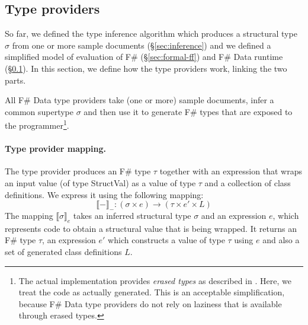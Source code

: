 \documentclass[10pt,preprint,blind,clearpagebib]{sigplanconf}
\newcommand{\ident}[1]{\textnormal{\sffamily #1}}
\newcommand{\sem}[1]{\llbracket #1 \rrbracket}
\begin{document}

\subsection{Type providers}
\label{sec:formal-tp}

So far, we defined the type inference algorithm which produces a structural type $\sigma$ from one 
or more sample documents (\S\ref{sec:inference}) and we defined a simplified model of evaluation
of F\# (\S\ref{sec:formal-ff}) and F\# Data runtime (\S\ref{sec:formal-tp}). In this section, we 
define how the type providers work, linking the two parts.

All F\# Data type providers take (one or more) sample documents, infer a common supertype $\sigma$
and then use it to generate F\# types that are exposed to the programmer\footnote{The actual 
implementation provides \emph{erased types} as described in \cite{fsharp-typeprov}. Here, we treat 
the code as actually generated. This is an acceptable simplification, because F\# Data type providers 
do not rely on laziness that is available through erased types.}. 

\paragraph{Type provider mapping.}
The type provider produces an F\# type $\tau$ together with an expression that wraps an input
value (of type \ident{StructVal}) as a value of type $\tau$ and a collection of class definitions. 
We express it using the following mapping:
%
\begin{equation*}
\sem{-}_{-} : (\sigma\times e) \rightarrow (\tau \times e' \times L)
\end{equation*}
%
The mapping $\sem{\sigma}_e$ takes an inferred structural type $\sigma$ and an expression $e$, 
which represents code to obtain a structural value that is being wrapped. It returns an F\# type 
$\tau$, an expression $e'$ which constructs a value of type $\tau$ using $e$ and also a set of 
generated class definitions $L$.
\end{document}
